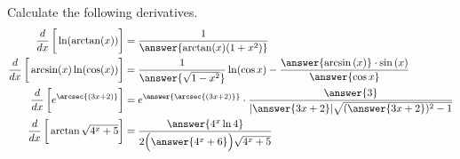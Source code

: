 \documentclass{ximera}
\author{Nela Lakos}
\begin{document}
\begin{exercise}

Calculate the following derivatives.
\begin{align*}
\frac{d}{dx}\left[\vphantom{\frac{d}{dx}}\ln(\arctan(x))\right] &= \frac{1}{\answer{\arctan(x)(1+x^2)}}\\
\frac{d}{dx}\left[\vphantom{\frac{d}{dx}}\arcsin(x)\ln(\cos(x))\right] &=\dfrac{1}{ \answer{\sqrt{1-x^2}}}\ln(\cos{x}) - \dfrac{\answer{\arcsin{(x)}}\cdot\sin{(x)}}{\answer{\cos{x}}}\\
\frac{d}{dx}\left[\vphantom{\frac{d}{dx}}e^{\arcsec{\left(3x+2\right)}}\right] &=e^{ \answer{\arcsec{\left(3x+2\right)}}}\cdot\dfrac{\answer{3}}{|\answer{3x+2}|\sqrt{(\answer{3x+2})^2-1}}\\
\frac{d}{dx}\left[\vphantom{\frac{d}{dx}}\arctan{\sqrt{4^x +5}}\right] &=\dfrac{\answer{4^{x}\ln{4}}}{2\Bigl(\answer{4^{x}+6}\Bigr)\sqrt{4^{x}+5}}
\end{align*}
\end{exercise}
\end{document}
